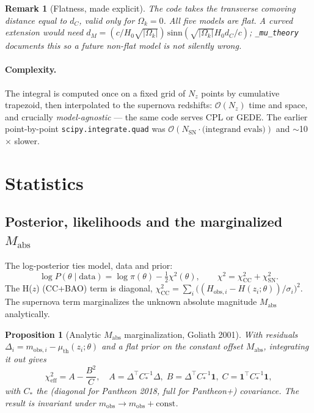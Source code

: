 \documentclass[11pt]{article}
\newtheorem{proposition}{Proposition}[section]
\newtheorem{remark}{Remark}[section]
\newcommand{\code}[1]{\texttt{#1}}
\newcommand{\bigO}{\mathcal{O}}
\begin{document}
\begin{remark}[Flatness, made explicit]
The code takes the transverse comoving distance equal to $d_C$, valid only for
$\Omega_k=0$. All five models are flat. A curved extension would need
$d_M=(c/H_0\sqrt{|\Omega_k|})\,\mathrm{sinn}(\sqrt{|\Omega_k|}H_0 d_C/c)$;
\code{\_mu\_theory} documents this so a future non-flat model is not silently
wrong.
\end{remark}

\paragraph{Complexity.}
The integral is computed once on a fixed grid of $N_z$ points by cumulative
trapezoid, then interpolated to the supernova redshifts: $\bigO(N_z)$ time and
space, and crucially \emph{model-agnostic} --- the same code serves CPL or
GEDE. The earlier point-by-point \code{scipy.integrate.quad} was $\bigO(N_{
\mathrm{SN}}\cdot\text{(integrand evals)})$ and $\sim$10$\times$ slower.

\section{Statistics}
\label{sec:stats}

\subsection{Posterior, likelihoods and the marginalized $M_{\mathrm{abs}}$}

The log-posterior ties model, data and prior:
\begin{equation}
\log P(\theta\mid \mathrm{data}) = \log\pi(\theta) - \tfrac12\chi^2(\theta),
\qquad
\chi^2 = \chi^2_{\mathrm{CC}} + \chi^2_{\mathrm{SN}}.
\end{equation}
The H($z$) (CC+BAO) term is diagonal,
$\chi^2_{\mathrm{CC}}=\sum_i\big((H_{\mathrm{obs},i}-H(z_i;\theta))/\sigma_i\big)^2$.
The supernova term marginalizes the unknown absolute magnitude
$M_{\mathrm{abs}}$ analytically.

\begin{proposition}[Analytic $M_{\mathrm{abs}}$ marginalization, Goliath 2001]
With residuals $\Delta_i=m_{\mathrm{obs},i}-\mu_{\mathrm{th}}(z_i;\theta)$ and a
flat prior on the constant offset $M_{\mathrm{abs}}$, integrating it out gives
\begin{equation}
\chi^2_{\mathrm{eff}} = A - \frac{B^2}{C},\quad
A=\Delta^\top C_{\!*}^{-1}\Delta,\;
B=\Delta^\top C_{\!*}^{-1}\mathbf{1},\;
C=\mathbf{1}^\top C_{\!*}^{-1}\mathbf{1},
\end{equation}
with $C_{\!*}$ the (diagonal for Pantheon 2018, full for Pantheon+) covariance.
The result is invariant under $m_{\mathrm{obs}}\!\to\!m_{\mathrm{obs}}+\text{const}$.
\end{proposition}
\end{document}
